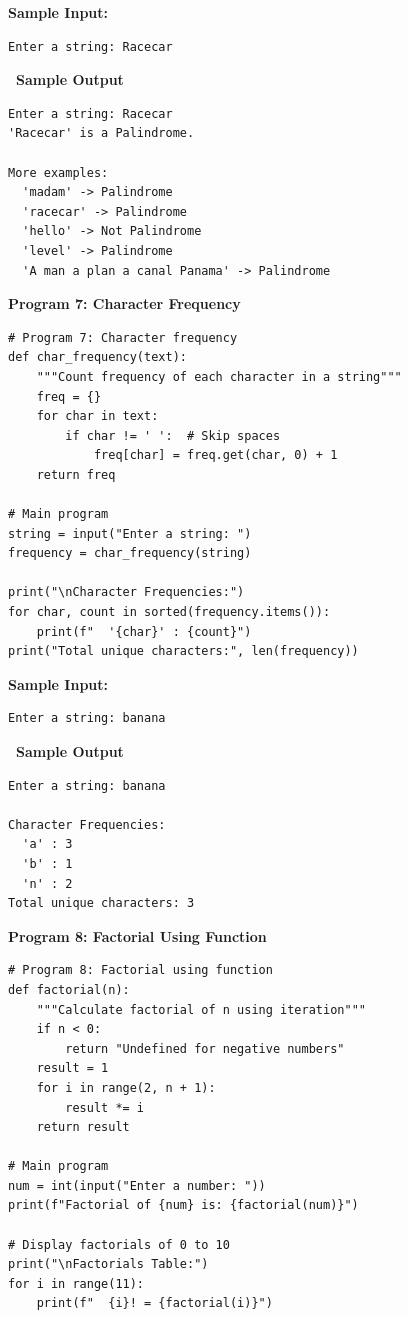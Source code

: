 \documentclass[12pt,a4paper]{article}
\newcommand{\outhead}{\noindent\colorbox{cmrgreen!25}%
  {\textbf{\small\color{cmrdark}~Sample Output~}}\par\vspace{-1pt}}
\begin{document}
\textbf{Sample Input:}
\begin{verbatim}
Enter a string: Racecar
\end{verbatim}

\outhead
\begin{lstlisting}[style=outputstyle]
Enter a string: Racecar
'Racecar' is a Palindrome.

More examples:
  'madam' -> Palindrome
  'racecar' -> Palindrome
  'hello' -> Not Palindrome
  'level' -> Palindrome
  'A man a plan a canal Panama' -> Palindrome
\end{lstlisting}

\vspace{0.5cm}

\textbf{Program 7: Character Frequency}

\begin{lstlisting}
# Program 7: Character frequency
def char_frequency(text):
    """Count frequency of each character in a string"""
    freq = {}
    for char in text:
        if char != ' ':  # Skip spaces
            freq[char] = freq.get(char, 0) + 1
    return freq

# Main program
string = input("Enter a string: ")
frequency = char_frequency(string)

print("\nCharacter Frequencies:")
for char, count in sorted(frequency.items()):
    print(f"  '{char}' : {count}")
print("Total unique characters:", len(frequency))
\end{lstlisting}

\textbf{Sample Input:}
\begin{verbatim}
Enter a string: banana
\end{verbatim}

\outhead
\begin{lstlisting}[style=outputstyle]
Enter a string: banana

Character Frequencies:
  'a' : 3
  'b' : 1
  'n' : 2
Total unique characters: 3
\end{lstlisting}

\vspace{0.5cm}

\textbf{Program 8: Factorial Using Function}

\begin{lstlisting}
# Program 8: Factorial using function
def factorial(n):
    """Calculate factorial of n using iteration"""
    if n < 0:
        return "Undefined for negative numbers"
    result = 1
    for i in range(2, n + 1):
        result *= i
    return result

# Main program
num = int(input("Enter a number: "))
print(f"Factorial of {num} is: {factorial(num)}")

# Display factorials of 0 to 10
print("\nFactorials Table:")
for i in range(11):
    print(f"  {i}! = {factorial(i)}")
\end{lstlisting}
\end{document}
